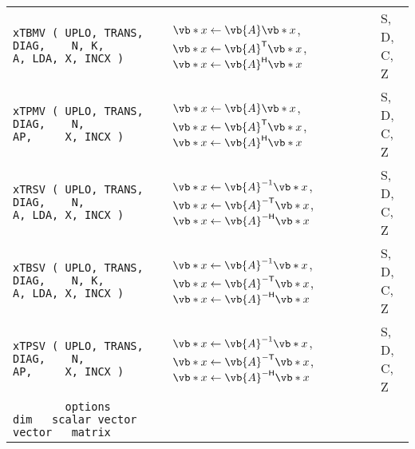 \documentclass[10pt,a3paper, landscape]{article}
\newcommand{\T}{\mathsf{T}}
\renewcommand{\H}{\mathsf{H}}
\begin{document}
\begin{tabular}{lll}
		\verb|xTBMV ( UPLO, TRANS, DIAG,    N, K,             A, LDA, X, INCX )                        |                                                                    & $\vb*{x} \gets \vb{A} \vb*{x}$, $\vb*{x} \gets \vb{A}^{\T} \vb*{x}$, $\vb*{x} \gets \vb{A}^{\H} \vb*{x}$                                                                                                                                                     & S, D, C, Z         \\
		\verb|xTPMV ( UPLO, TRANS, DIAG,    N,                AP,     X, INCX )                        |                                                                    & $\vb*{x} \gets \vb{A} \vb*{x}$, $\vb*{x} \gets \vb{A}^{\T} \vb*{x}$, $\vb*{x} \gets \vb{A}^{\H} \vb*{x}$                                                                                                                                                     & S, D, C, Z         \\
		\verb|xTRSV ( UPLO, TRANS, DIAG,    N,                A, LDA, X, INCX )                        |                                                                    & $\vb*{x} \gets \vb{A}^{-1} \vb*{x}$, $\vb*{x} \gets \vb{A}^{-\T} \vb*{x}$, $\vb*{x} \gets \vb{A}^{-\H} \vb*{x}$                                                                                                                                              & S, D, C, Z         \\
		\verb|xTBSV ( UPLO, TRANS, DIAG,    N, K,             A, LDA, X, INCX )                        |                                                                    & $\vb*{x} \gets \vb{A}^{-1} \vb*{x}$, $\vb*{x} \gets \vb{A}^{-\T} \vb*{x}$, $\vb*{x} \gets \vb{A}^{-\H} \vb*{x}$                                                                                                                                              & S, D, C, Z         \\
		\verb|xTPSV ( UPLO, TRANS, DIAG,    N,                AP,     X, INCX )                        |                                                                    & $\vb*{x} \gets \vb{A}^{-1} \vb*{x}$, $\vb*{x} \gets \vb{A}^{-\T} \vb*{x}$, $\vb*{x} \gets \vb{A}^{-\H} \vb*{x}$                                                                                                                                              & S, D, C, Z         \\
		\verb|        options            dim   scalar vector   vector   matrix                         |                                                                    &                                                                                                                                                                                                                                                              &                    \\

\end{tabular}
\end{document}
